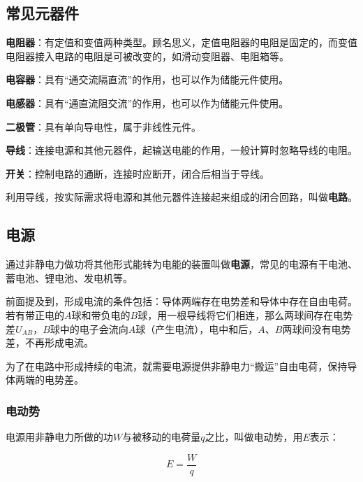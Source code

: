 
\begin{issues}
\issueDraft
\issueTODO
\end{issues}


\subsection{常见元器件}

\textbf{电阻器}：有定值和变值两种类型。顾名思义，定值电阻器的电阻是固定的，而变值电阻器接入电路的电阻是可被改变的，如滑动变阻器、电阻箱等。

\textbf{电容器}：具有“通交流隔直流”的作用，也可以作为储能元件使用。

\textbf{电感器}：具有“通直流阻交流”的作用，也可以作为储能元件使用。

\textbf{二极管}：具有单向导电性，属于非线性元件。

\textbf{导线}：连接电源和其他元器件，起输送电能的作用，一般计算时忽略导线的电阻。

\textbf{开关}：控制电路的通断，连接时应断开，闭合后相当于导线。

利用导线，按实际需求将电源和其他元器件连接起来组成的闭合回路，叫做\textbf{电路}。

\subsection{电源}

通过非静电力做功将其他形式能转为电能的装置叫做\textbf{电源}，常见的电源有干电池、蓄电池、锂电池、发电机等。

前面提及到，形成电流的条件包括：导体两端存在电势差和导体中存在自由电荷。若有带正电的$A$球和带负电的$B$球，用一根导线将它们相连，那么两球间存在电势差$U_{AB}$，$B$球中的电子会流向$A$球（产生电流），电中和后，$A$、$B$两球间没有电势差，不再形成电流。

为了在电路中形成持续的电流，就需要电源提供非静电力“搬运”自由电荷，保持导体两端的电势差。

\subsubsection{电动势}

电源用非静电力所做的功$W$与被移动的电荷量$q$之比，叫做电动势，用$E$表示：

\begin{equation}
E=\frac{W}{q}
\end{equation}

